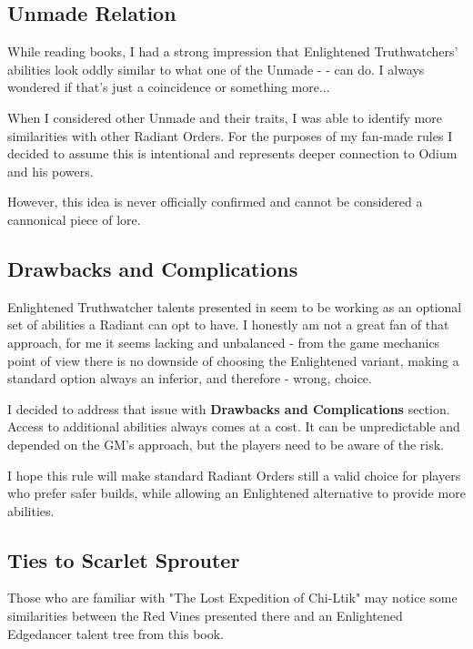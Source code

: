 \subsection{Unmade Relation}

While reading \bookSA{} books, I had a strong impression that Enlightened Truthwatchers' abilities look oddly similar to what one of the Unmade - \npcMoelach{} - can do. I always wondered if that's just a coincidence or something more...

When I considered other Unmade and their traits, I was able to identify more similarities with other Radiant Orders. For the purposes of my fan-made rules I decided to assume this is intentional and represents deeper connection to Odium and his powers.

However, this idea is never officially confirmed and cannot be considered a cannonical piece of lore.



\subsection{Drawbacks and Complications}

Enlightened Truthwatcher talents presented in \handbook{} seem to be working as an optional set of abilities a Radiant can opt to have. I honestly am not a great fan of that approach, for me it seems lacking and unbalanced - from the game mechanics point of view there is no downside of choosing the Enlightened variant, making a standard option always an inferior, and therefore - wrong, choice.

I decided to address that issue with \textbf{Drawbacks and Complications} section. Access to additional abilities always comes at a cost. It can be unpredictable and depended on the GM's approach, but the players need to be aware of the risk. 

I hope this rule will make standard Radiant Orders still a valid choice for players who prefer safer builds, while allowing an Enlightened alternative to provide more abilities.



\subsection{Ties to Scarlet Sprouter}

Those who are familiar with "The Lost Expedition of Chi-Ltik" may notice some similarities between the Red Vines presented there and an Enlightened Edgedancer talent tree from this book.

